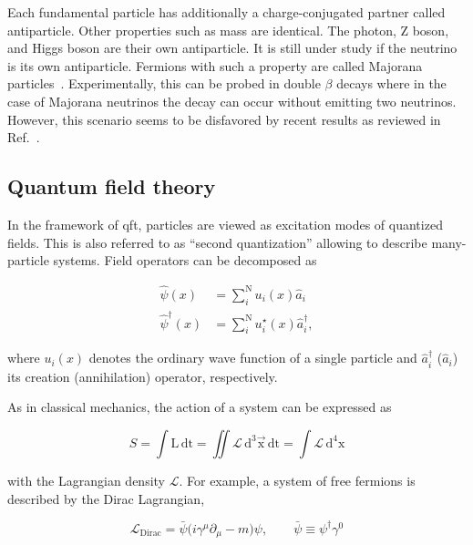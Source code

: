 Each fundamental particle has additionally a charge-conjugated partner called antiparticle. Other properties such as mass are identical. The photon, Z boson, and Higgs boson are their own antiparticle. It is still under study if the neutrino is its own antiparticle. Fermions with such a property are called Majorana particles~\cite{Majorana2006}. Experimentally, this can be probed in double $\beta$ decays where in the case of Majorana neutrinos the decay can occur without emitting two neutrinos. However, this scenario seems to be disfavored by recent results as reviewed in Ref.~\cite{Dell'Oro:2016dbc}.


\subsection{Quantum field theory}

In the framework of \gls{qft}, particles are viewed as excitation modes of quantized fields. This is also referred to as ``second quantization'' allowing to describe many-particle systems. Field operators can be decomposed as

\begin{align}
    \hat{\psi}(x)&=\sum_{i}^{\mathrm{N}}u_{i}(x)\hat{a}_{i} \\
    \hat{\psi}^{\dagger}(x)&=\sum_{i}^{\mathrm{N}}u^{\star}_{i}(x)\hat{a}^{\dagger}_{i},
\end{align}

where $u_{i}(x)$ denotes the ordinary wave function of a single particle and $\hat{a}^{\dagger}_{i}$ ($\hat{a}_{i}$) its creation (annihilation) operator, respectively.

As in classical mechanics, the action of a system can be expressed as

\begin{equation}
S=\int\mathrm{L}\,\mathrm{dt}=\iint\mathcal{L}\,\mathrm{d}^{3}\vec{\mathrm{x}}\,\mathrm{dt}=\int\mathcal{L}\,\mathrm{d}^{4}\mathrm{x}
\end{equation}

with the Lagrangian density $\mathcal{L}$. For example, a system of free fermions is described by the Dirac Lagrangian,

\begin{equation}
\mathcal{L}_\mathrm{Dirac}=\bar{\psi}\big(i\gamma^\mu\partial_\mu-m\big)\psi,\qquad\bar{\psi}\equiv\psi^\dagger\gamma^{0}
\end{equation}

